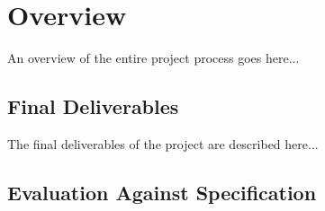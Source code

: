 \chapter{Overview}
An overview of the entire project process goes here...

\section{Final Deliverables}
The final deliverables of the project are described here...

\section{Evaluation Against Specification}

